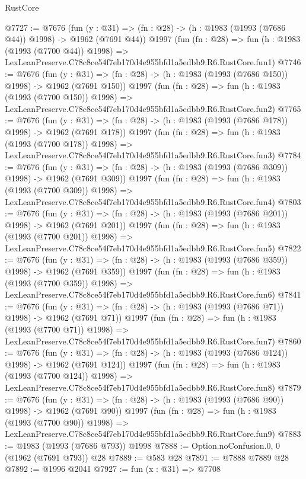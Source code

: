 \begin{lexlean}{RustCore}
\begin{coremodule}
@7727 := @7676
    (fun (y : @31) => (fn : @28) -> (h : @1983 (@1993 (@7686 @44)) @1998) -> @1962 (@7691 @44))
    @1997
    (fun (fn : @28) =>
    fun (h : @1983 (@1993 (@7700 @44)) @1998) =>
    LexLeanPreserve.C78c8ce54f7eb170d4e955bfd1a5edbb9.R6.RustCore.fun1)
@7746 := @7676
    (fun (y : @31) => (fn : @28) -> (h : @1983 (@1993 (@7686 @150)) @1998) -> @1962 (@7691 @150))
    @1997
    (fun (fn : @28) =>
    fun (h : @1983 (@1993 (@7700 @150)) @1998) =>
    LexLeanPreserve.C78c8ce54f7eb170d4e955bfd1a5edbb9.R6.RustCore.fun2)
@7765 := @7676
    (fun (y : @31) => (fn : @28) -> (h : @1983 (@1993 (@7686 @178)) @1998) -> @1962 (@7691 @178))
    @1997
    (fun (fn : @28) =>
    fun (h : @1983 (@1993 (@7700 @178)) @1998) =>
    LexLeanPreserve.C78c8ce54f7eb170d4e955bfd1a5edbb9.R6.RustCore.fun3)
@7784 := @7676
    (fun (y : @31) => (fn : @28) -> (h : @1983 (@1993 (@7686 @309)) @1998) -> @1962 (@7691 @309))
    @1997
    (fun (fn : @28) =>
    fun (h : @1983 (@1993 (@7700 @309)) @1998) =>
    LexLeanPreserve.C78c8ce54f7eb170d4e955bfd1a5edbb9.R6.RustCore.fun4)
@7803 := @7676
    (fun (y : @31) => (fn : @28) -> (h : @1983 (@1993 (@7686 @201)) @1998) -> @1962 (@7691 @201))
    @1997
    (fun (fn : @28) =>
    fun (h : @1983 (@1993 (@7700 @201)) @1998) =>
    LexLeanPreserve.C78c8ce54f7eb170d4e955bfd1a5edbb9.R6.RustCore.fun5)
@7822 := @7676
    (fun (y : @31) => (fn : @28) -> (h : @1983 (@1993 (@7686 @359)) @1998) -> @1962 (@7691 @359))
    @1997
    (fun (fn : @28) =>
    fun (h : @1983 (@1993 (@7700 @359)) @1998) =>
    LexLeanPreserve.C78c8ce54f7eb170d4e955bfd1a5edbb9.R6.RustCore.fun6)
@7841 := @7676
    (fun (y : @31) => (fn : @28) -> (h : @1983 (@1993 (@7686 @71)) @1998) -> @1962 (@7691 @71))
    @1997
    (fun (fn : @28) =>
    fun (h : @1983 (@1993 (@7700 @71)) @1998) =>
    LexLeanPreserve.C78c8ce54f7eb170d4e955bfd1a5edbb9.R6.RustCore.fun7)
@7860 := @7676
    (fun (y : @31) => (fn : @28) -> (h : @1983 (@1993 (@7686 @124)) @1998) -> @1962 (@7691 @124))
    @1997
    (fun (fn : @28) =>
    fun (h : @1983 (@1993 (@7700 @124)) @1998) =>
    LexLeanPreserve.C78c8ce54f7eb170d4e955bfd1a5edbb9.R6.RustCore.fun8)
@7879 := @7676
    (fun (y : @31) => (fn : @28) -> (h : @1983 (@1993 (@7686 @90)) @1998) -> @1962 (@7691 @90))
    @1997
    (fun (fn : @28) =>
    fun (h : @1983 (@1993 (@7700 @90)) @1998) =>
    LexLeanPreserve.C78c8ce54f7eb170d4e955bfd1a5edbb9.R6.RustCore.fun9)
@7883 := @1983 (@1993 (@7686 @793)) @1998
@7888 := Option.noConfusion.{0, 0} (@1962 (@7691 @793)) @28
@7889 := @583 @28
@7891 := @7888 @7889 @28
@7892 := @1996 @2041
@7927 := fun (x : @31) =>
  @7708

\end{coremodule}
\end{lexlean}
